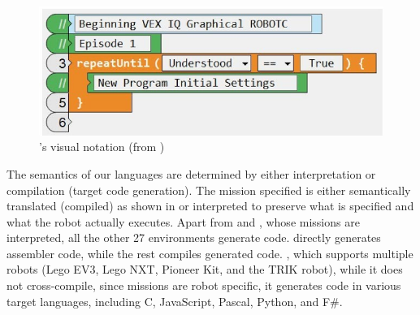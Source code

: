 
\begin{figure}[t]
	\centering
		\includegraphics[width=.8\columnwidth]{robotc2.png}	\caption{\robotc's visual notation (from \cite{Admin})}
	\label{fig:robotcgraphical}
	\vspace{-.4cm}
\end{figure}




 The semantics of our languages are determined by either interpretation or compilation (target code generation). The mission specified is either semantically translated (compiled) as shown in  or interpreted to preserve what is specified and what the robot actually executes. Apart from \lego and \codelab, whose missions are interpreted, all the other 27 environments generate code. \metabot directly generates assembler code, while the rest compiles generated code. \trik, which supports multiple robots (Lego EV3, Lego NXT, Pioneer Kit, and the TRIK robot), while it does not cross-compile, since missions are robot specific, it generates code in various target languages, including C, JavaScript, Pascal, Python, and F\#.



